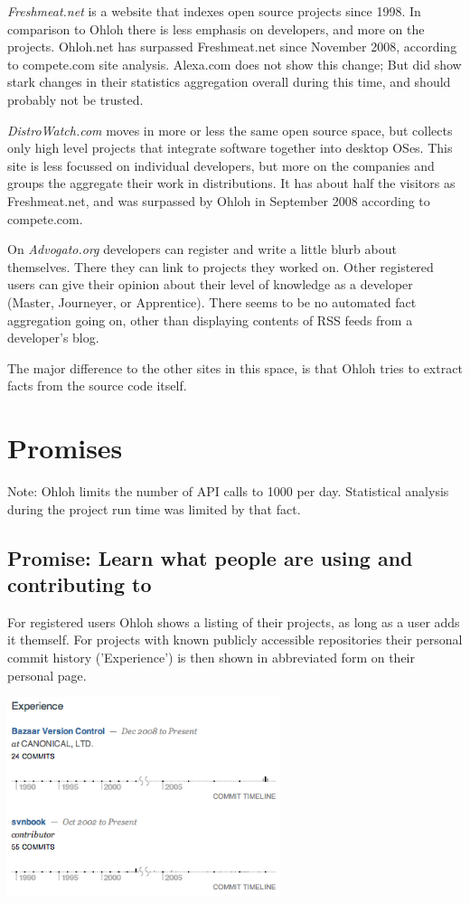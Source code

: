 \documentclass{sig-alternate}
\begin{document}
\emph{Freshmeat.net} is a website that indexes open source pro\-jects since 1998. In comparison to Ohloh there is less emphasis on developers, and more on the projects. Ohloh.net has surpassed Freshmeat.net since November 2008, according to compete.com site analysis. Alexa.com does not show this change; But did show stark changes in their statistics aggregation overall during this time, and should probably not be trusted.

\emph{DistroWatch.com} moves in more or less the same open source space, but collects only high level projects that integrate software together into desktop OSes. This site is less focussed on individual developers, but more on the companies and groups the aggregate their work in distributions. It has about half the visitors as Freshmeat.net, and was surpassed by Ohloh in September 2008 according to compete.com.

On \emph{Advogato.org} developers can register and write a little blurb about themselves. There they can link to projects they worked on. Other registered users can give their opinion about their level of knowledge as a developer (Master, Journeyer, or Apprentice). There seems to be no automated fact aggregation going on, other than displaying contents of RSS feeds from a developer's blog.

The major difference to the other sites in this space, is that Ohloh tries to extract facts from the source code itself.


\section{Promises}\label{sec:prom}

Note: Ohloh limits the number of API calls to 1000 per day. Statistical analysis during the project run time was limited by that fact.


\subsection{Promise: Learn what people are using and contributing to}

For registered users Ohloh shows a listing of their projects, as long as a user adds it themself. For projects with known publicly accessible repositories their personal commit history ('Experience') is then shown in abbreviated form on their personal page.

\includegraphics[width=80mm]{Experience.png}
\end{document}
